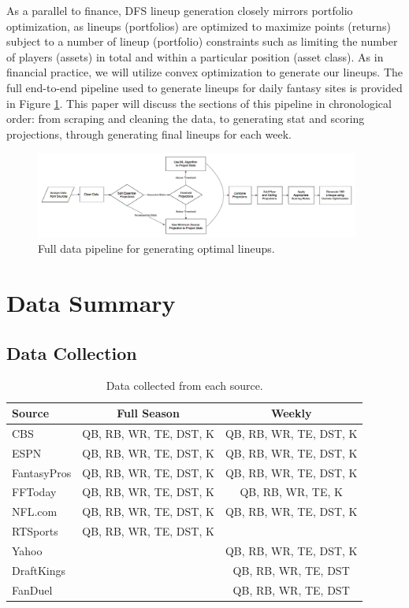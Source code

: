 \documentclass[12pt]{article}
\begin{document}
As a parallel to finance, DFS lineup generation closely mirrors portfolio optimization, as lineups (portfolios) are optimized to maximize points (returns) subject to a number of lineup (portfolio) constraints such as limiting the number of players (assets) in total and within a particular position (asset class). As in financial practice, we will utilize convex optimization to generate our lineups. The full end-to-end pipeline used to generate lineups for daily fantasy sites is provided in Figure \ref{pipeline}. This paper will discuss the sections of this pipeline in chronological order: from scraping and cleaning the data, to generating stat and scoring projections, through generating final lineups for each week.

\begin{figure}[H]
  \centering
  \includegraphics[width=0.95\textwidth]{../figures/pipeline}
  \caption{Full data pipeline for generating optimal lineups.}
  \label{pipeline}
\end{figure}

\pagebreak
\section{Data Summary}
\subsection{Data Collection}
\begin{table}[H]
\caption{Data collected from each source.}
\small
\label{sources}
\centering
\begin{tabular}{lcc}
	\toprule
	Source        &  Full Season              &  Weekly \\
	\midrule
	CBS           &  QB, RB, WR, TE, DST, K   &   QB, RB, WR, TE, DST, K \\
	ESPN          &  QB, RB, WR, TE, DST, K   &   QB, RB, WR, TE, DST, K \\
	FantasyPros   &  QB, RB, WR, TE, DST, K   &   QB, RB, WR, TE, DST, K \\
	FFToday       &  QB, RB, WR, TE, DST, K   &   QB, RB, WR, TE, K \\
	NFL.com       &  QB, RB, WR, TE, DST, K   &   QB, RB, WR, TE, DST, K \\
	RTSports      &  QB, RB, WR, TE, DST, K   &    {} \\
	Yahoo         &  {}                       &   QB, RB, WR, TE, DST, K \\
	\midrule
	DraftKings    &  {}                       &   QB, RB, WR, TE, DST \\
 	FanDuel       &  {}                       &   QB, RB, WR, TE, DST \\
	\bottomrule
\end{tabular}
\end{table}
\end{document}
